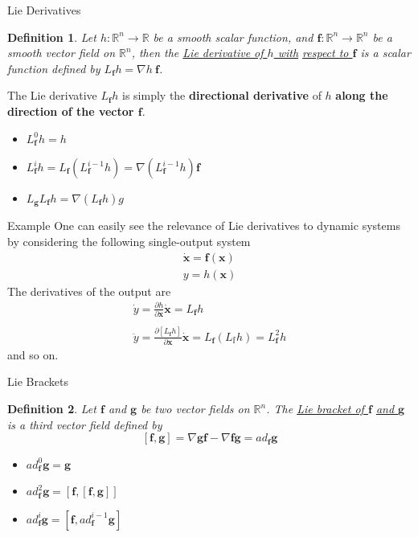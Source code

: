 \documentclass{beamer}
\renewcommand{\vec}[1]{\ensuremath{\boldsymbol{#1}}} %
\begin{document}
\begin{frame}{Lie Derivatives}
    \newtheorem{myDef}{Definition}
    \begin{myDef}
        Let $h : \mathbb{R}^{n} \rightarrow \mathbb{R}$ be a smooth scalar function, and $\vec{f} : \mathbb{R}^{n} \rightarrow \mathbb{R}^{n}$ be a smooth vector field on $\mathbb{R}^{n}$, then the \underline{Lie derivative of $h$ with}
        \underline{respect to \vec{f}} is a scalar function defined by {\color{red} $L_{\vec{f}}h = \nabla h ~\vec{f}$}.
    \end{myDef}

    The Lie derivative $L_{\vec{f}}h$ is simply the \textbf{directional derivative} of $h$ \textbf{along the direction of the vector \vec{f}}.
    \begin{itemize}
      \item $L_{\vec{f}}^{0}h = h$
      \item $L_{\vec{f}}^{i}h = L_{\vec{f}}(L_{\vec{f}}^{i-1}h) = \nabla(L_{\vec{f}}^{i-1}h )\vec{f}$
      \item $L_{\vec{g}}L_{\vec{f}}h = \nabla(L_{\vec{f}}h)g $
    \end{itemize}

\end{frame}

\begin{frame}{Example}
    One can easily see the relevance of Lie derivatives to dynamic systems by considering the following single-output system
    $$
    \begin{array}{l}{\dot{\mathbf{x}}=\mathbf{f}(\mathbf{x})} \\ {y=h(\mathbf{x})}\end{array}
    $$
    The derivatives of the output are
    $$
    \begin{array}{l}{\dot{y}=\frac{\partial h}{\partial \mathbf{x}} \dot{\mathbf{x}}=L_{\mathbf{f}} h} \\ \\
    {\ddot{y}=\frac{\partial\left[L_{\mathbf{f}} h\right]}{\partial \mathbf{x}} \dot{\mathbf{x}} = L_{\mathbf{f}}(L_{\mathbb{f}}h) =L_{\mathbf{f}}^{2} h}\end{array}
    $$
    and so on.
\end{frame}


\begin{frame}{Lie Brackets}
    \begin{myDef}
        Let \vec{f} and \vec{g} be two vector fields on $\mathbb{R}^{n}$. The \underline{Lie bracket of \vec{f}}
        \underline{and \vec{g}} is a third vector field defined by   
        $$
        [\vec{f}, \vec{g}] = \nabla \vec{g} \vec{f} - \nabla \vec{f} \vec{g} = ad_{\vec{f}}\vec{g}
        $$
    \end{myDef}
    \begin{itemize}
      \item $ad_{\vec{f}}^{0}\vec{g} = \vec{g}$
      \item $ad_{\vec{f}}^{2}\vec{g} = [\vec{f}, [\vec{f}, \vec{g}]]$
      \item $ad_{\vec{f}}^{i}\vec{g} = [\vec{f}, ad_{\vec{f}}^{i-1}\vec{g}]$
    \end{itemize}
\end{frame}
\end{document}
